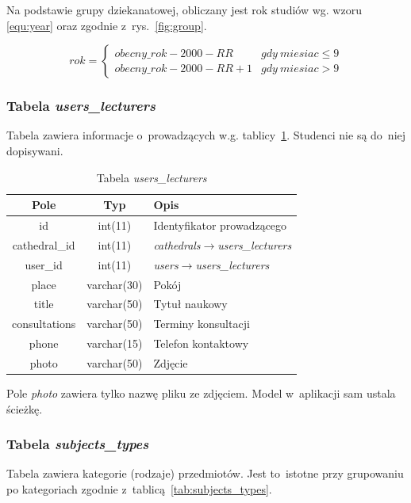 \documentclass[a4paper,12pt,oneside]{report}
\begin{document}
Na podstawie grupy dziekanatowej, obliczany jest rok studiów wg. wzoru \ref{equ:year} oraz zgodnie z~rys.~\ref{fig:group}.

\begin{equation}
  rok = \left\{ \begin{array}{ll}
  obecny\_rok - 2000 - RR & gdy~miesiac \le 9\\
  obecny\_rok - 2000 - RR + 1 & gdy~miesiac > 9
  \end{array} \right.
  \label{equ:year}
\end{equation}

\newpage
\subsubsection{Tabela \emph{users\_lecturers}}
\label{subsub:users_lecturers}
Tabela zawiera informacje o~prowadzących w.g. tablicy~\ref{tab:users_lecturers}. Studenci nie są do~niej dopisywani.

\begin{table}[h]
  \centering
  \begin{tabular}{|c|c|l|}\hline
  Pole & Typ & Opis \\\hline
  id            & int(11)     & Identyfikator prowadzącego\\
  cathedral\_id & int(11)     & \emph{cathedrals}$\to$\emph{users\_lecturers}\\
  user\_id      & int(11)     & \emph{users}$\to$\emph{users\_lecturers}\\
  place         & varchar(30) & Pokój \\
  title         & varchar(50) & Tytuł naukowy \\
  consultations & varchar(50) & Terminy konsultacji \\
  phone         & varchar(15) & Telefon kontaktowy \\
  photo         & varchar(50) & Zdjęcie \\\hline
  \end{tabular}
  \caption{Tabela \emph{users\_lecturers}\label{tab:users_lecturers}}
\end{table}
Pole \emph{photo} zawiera tylko nazwę pliku ze zdjęciem. Model w~aplikacji sam ustala ścieżkę.

\subsubsection{Tabela \emph{subjects\_types}}
\label{subsub:subjects_types}
Tabela zawiera kategorie (rodzaje) przedmiotów. Jest to~istotne przy grupowaniu po kategoriach zgodnie z~tablicą~\ref{tab:subjects_types}.
\end{document}
